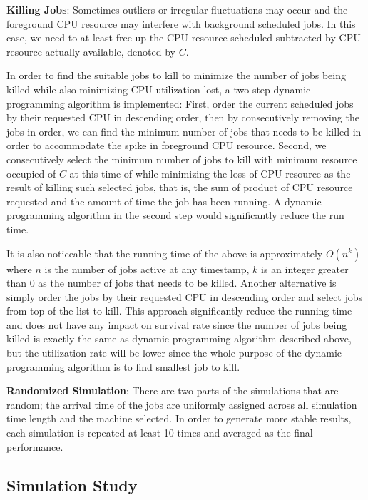 \documentclass{article}
\begin{document}
\begin{flushleft}
\textbf{Killing Jobs}: Sometimes outliers or irregular fluctuations may occur and the foreground CPU resource may interfere with background scheduled jobs. In this case, we need to at least free up the CPU resource scheduled subtracted by CPU resource actually available, denoted by $C$.

In order to find the suitable jobs to kill to minimize the number of jobs being killed while also minimizing CPU utilization lost, a two-step dynamic programming algorithm is implemented: First, order the current scheduled jobs by their requested CPU in descending order, then by consecutively removing the jobs in order, we can find the minimum number of jobs that needs to be killed in order to accommodate the spike in foreground CPU resource. Second, we consecutively select the minimum number of jobs to kill with minimum resource occupied of $C$ at this time of while minimizing the loss of CPU resource as the result of killing such selected jobs, that is, the sum of product of CPU resource requested and the amount of time the job has been running. A dynamic programming algorithm in the second step would significantly reduce the run time.

It is also noticeable that the running time of the above is approximately $O(n^k)$ where $n$ is the number of jobs active at any timestamp, $k$ is an integer greater than $0$ as the number of jobs that needs to be killed. Another alternative is simply order the jobs by their requested CPU in descending order and select jobs from top of the list to kill. This approach significantly reduce the running time and does not have any impact on survival rate since the number of jobs being killed is exactly the same as dynamic programming algorithm described above, but the utilization rate will be lower since the whole purpose of the dynamic programming algorithm is to find smallest job to kill.

\textbf{Randomized Simulation}: There are two parts of the simulations that are random; the arrival time of the jobs are uniformly assigned across all simulation time length and the machine selected. In order to generate more stable results, each simulation is repeated at least 10 times and averaged as the final performance.
\end{flushleft}

\subsection{Simulation Study}
\end{document}
